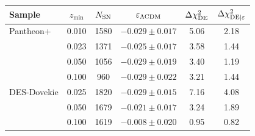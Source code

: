 \begin{tabular}{lccccc}
\hline\hline
Sample & $z_{\min}$ & $N_{\rm SN}$ & $\varepsilon_{\Lambda{\rm CDM}}$ & $\Delta\chi^2_{\rm DE}$ & $\Delta\chi^2_{{\rm DE}|\varepsilon}$ \\
\hline
Pantheon+ & 0.010 & 1580 & $-0.029 \pm 0.017$ & 5.06 & 2.18 \\
 & 0.023 & 1371 & $-0.025 \pm 0.017$ & 3.58 & 1.44 \\
 & 0.050 & 1056 & $-0.029 \pm 0.019$ & 3.40 & 1.19 \\
 & 0.100 & 960 & $-0.029 \pm 0.022$ & 3.21 & 1.44 \\
\hline
DES-Dovekie & 0.025 & 1820 & $-0.029 \pm 0.015$ & 7.16 & 4.08 \\
 & 0.050 & 1679 & $-0.021 \pm 0.017$ & 3.24 & 1.89 \\
 & 0.100 & 1619 & $-0.008 \pm 0.020$ & 0.95 & 0.82 \\
\hline\hline
\end{tabular}
